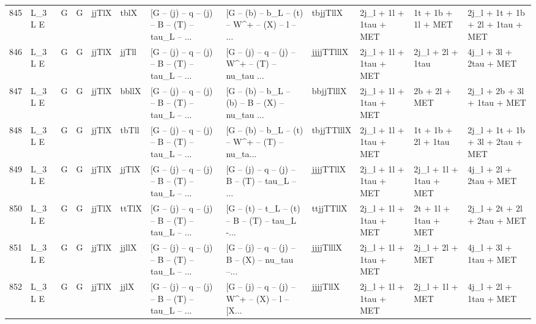 \begin{tabular}{llllllllllll}
845  &      L\_3 L E &     G &     G &       jjTlX &        tblX &  [G -- (j) -- q -- (j) -- B -- (T) -- tau\_L -- ... &  [G -- (b) -- b\_L -- (t) -- W\textasciicircum + -- (X) -- l -- ... &    tbjjTllX &   2j\_l + 1l + 1tau + MET &       1t + 1b + 1l + MET &   2j\_l + 1t + 1b + 2l + 1tau + MET \\
846  &      L\_3 L E &     G &     G &       jjTlX &       jjTll &  [G -- (j) -- q -- (j) -- B -- (T) -- tau\_L -- ... &  [G -- (j) -- q -- (j) -- W\textasciicircum + -- (T) -- nu\_tau ... &  jjjjTTlllX &   2j\_l + 1l + 1tau + MET &         2j\_l + 2l + 1tau &             4j\_l + 3l + 2tau + MET \\
847  &      L\_3 L E &     G &     G &       jjTlX &       bbllX &  [G -- (j) -- q -- (j) -- B -- (T) -- tau\_L -- ... &  [G -- (b) -- b\_L -- (b) -- B -- (X) -- nu\_tau ... &   bbjjTlllX &   2j\_l + 1l + 1tau + MET &            2b + 2l + MET &        2j\_l + 2b + 3l + 1tau + MET \\
848  &      L\_3 L E &     G &     G &       jjTlX &       tbTll &  [G -- (j) -- q -- (j) -- B -- (T) -- tau\_L -- ... &  [G -- (b) -- b\_L -- (t) -- W\textasciicircum + -- (T) -- nu\_ta... &  tbjjTTlllX &   2j\_l + 1l + 1tau + MET &      1t + 1b + 2l + 1tau &   2j\_l + 1t + 1b + 3l + 2tau + MET \\
849  &      L\_3 L E &     G &     G &       jjTlX &       jjTlX &  [G -- (j) -- q -- (j) -- B -- (T) -- tau\_L -- ... &  [G -- (j) -- q -- (j) -- B -- (T) -- tau\_L -- ... &   jjjjTTllX &   2j\_l + 1l + 1tau + MET &   2j\_l + 1l + 1tau + MET &             4j\_l + 2l + 2tau + MET \\
850  &      L\_3 L E &     G &     G &       jjTlX &       ttTlX &  [G -- (j) -- q -- (j) -- B -- (T) -- tau\_L -- ... &  [G -- (t) -- t\_L -- (t) -- B -- (T) -- tau\_L -... &   ttjjTTllX &   2j\_l + 1l + 1tau + MET &     2t + 1l + 1tau + MET &        2j\_l + 2t + 2l + 2tau + MET \\
851  &      L\_3 L E &     G &     G &       jjTlX &       jjllX &  [G -- (j) -- q -- (j) -- B -- (T) -- tau\_L -- ... &  [G -- (j) -- q -- (j) -- B -- (X) -- nu\_tau --... &   jjjjTlllX &   2j\_l + 1l + 1tau + MET &          2j\_l + 2l + MET &             4j\_l + 3l + 1tau + MET \\
852  &      L\_3 L E &     G &     G &       jjTlX &        jjlX &  [G -- (j) -- q -- (j) -- B -- (T) -- tau\_L -- ... &  [G -- (j) -- q -- (j) -- W\textasciicircum + -- (X) -- l -- [X... &    jjjjTllX &   2j\_l + 1l + 1tau + MET &          2j\_l + 1l + MET &             4j\_l + 2l + 1tau + MET \\

\end{tabular}
